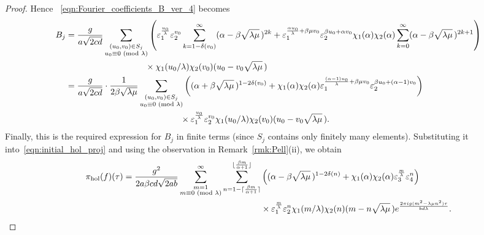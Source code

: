 \documentclass[11pt,reqno]{amsart}
\renewcommand{\=}{\;=\;}
\theoremstyle{myremark}
\begin{document}
\begin{proof}
Hence ~\eqref{eqn:Fourier_coefficients_B_ver_4} becomes
{\fontsize{9}{10}\selectfont
\begin{align*}
B_j &= {g \over a\sqrt{2cd}} \sum_{\substack{(u_0,v_0) \in S_j \\ u_0 \equiv 0 \text{ (mod $\lambda$)}}} \left( \varepsilon_1^{u_0 \over \lambda} \varepsilon_2^{v_0} \sum_{k=1-\delta(v_0)}^\infty (\alpha - \beta \sqrt{\lambda\mu} \,)^{2k} + \varepsilon_1^{{\alpha u_0 \over \lambda}+\beta\mu v_0} \varepsilon_2^{\beta u_0 + \alpha v_0} \chi_1(\alpha)\chi_2(\alpha) \sum_{k=0}^\infty (\alpha - \beta \sqrt{\lambda\mu} \,)^{2k+1} \right) \\ &\quad \hphantom{{g \over a\sqrt{2cd}} \sum_{\substack{(u_0,v_0) \in S_j \\ u_0 \equiv 0 \text{ (mod $\lambda$)}}}} \times \chi_1(u_0/\lambda) \chi_2(v_0) (u_0 - v_0 \sqrt{\lambda\mu} \,) \\
&= {g \over a\sqrt{2cd}} \cdot {1 \over 2\beta\sqrt{\lambda\mu}} \sum_{\substack{(u_0,v_0) \in S_j \\ u_0 \equiv 0 \text{ (mod $\lambda$)}}} \left( (\alpha + \beta \sqrt{\lambda\mu} \,)^{1-2\delta(v_0)} + \chi_1(\alpha)\chi_2(\alpha) \varepsilon_1^{{(\alpha-1) u_0 \over \lambda}+\beta\mu v_0} \varepsilon_2^{\beta u_0 + (\alpha-1) v_0} \right) \\
&\quad \hphantom{{g \over a\sqrt{2cd}} \cdot {1 \over 2\beta\sqrt{\lambda\mu}} \sum_{\substack{(u_0,v_0) \in S_j \\ u_0 \equiv 0 \text{ (mod $\lambda$)}}}} \times \varepsilon_1^{u_0 \over \lambda} \varepsilon_2^{v_0} \chi_1(u_0/\lambda) \chi_2(v_0) (u_0 - v_0 \sqrt{\lambda\mu} \,).
\end{align*}
}
Finally, this is the required expression for $B_j$ in finite terms (since $S_j$ contains only finitely many elements). 
Substituting it into~\eqref{eqn:initial_hol_proj} and using the observation in Remark~\ref{rmk:Pell}(ii), we obtain
{\fontsize{11}{10}\selectfont
\begin{align*}
\pi_\text{hol}(f)(\tau) = {g^2 \over 2a\beta cd\sqrt{2ab}} \sum_{\substack{m=1 \\ m \equiv 0 \text{ (mod $\lambda$)}}}^\infty \sum_{n=1-\lceil {\beta m \over \alpha+1} \rceil}^{\lfloor {\beta m \over \alpha+1} \rfloor} &\left( (\alpha - \beta \sqrt{\lambda\mu} \,)^{1-2\delta(n)} + \chi_1(\alpha)\chi_2(\alpha) \varepsilon_3^{m \over \lambda} \varepsilon_4^n \right) \\
&\times \varepsilon_1^{m \over \lambda} \varepsilon_2^n \chi_1(m/\lambda) \chi_2(n) (m - n \sqrt{\lambda\mu} \,) e^{2\pi i g(m^2-\lambda\mu n^2)\tau \over bd\lambda}.

\end{align*}}
\end{proof}
\end{document}
